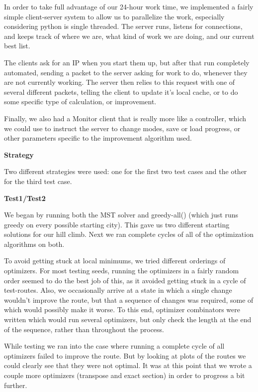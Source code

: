 \documentclass[letterpaper,10pt,titlepage,fleqn]{article}
\begin{document}
In order to take full advantage of our 24-hour work time, we implemented a fairly simple client-server system to allow us to parallelize the work, especially considering python is single threaded.  The server runs, listens for connections, and keeps track of where we are, what kind of work we are doing, and our current best list.  

The clients ask for an IP when you start them up, but after that run completely automated, sending a packet to the server asking for work to do, whenever they are not currently working.  The server then relies to this request with one of several different packets, telling the client to update it's local cache, or to do some specific type of calculation, or improvement.

Finally, we also had a Monitor client that is really more like a controller, which we could use to instruct the server to change modes, save or load progress, or other parameters specific to the improvement algorithm used.

\begin{Large}
\textbf{Strategy} \\
\end{Large}

Two different strategies were used: one for the first two test cases and the other for the third test case.

\textbf{Test1/Test2}

We began by running both the MST solver and greedy-all() (which just runs greedy on every possible starting city). This gave us two different starting solutions for our hill climb. Next we ran complete cycles of all of the optimization algorithms on both.

To avoid getting stuck at local minimums, we tried different orderings of optimizers. For most testing seeds, running the optimizers in a fairly random order seemed to do the best job of this, as it avoided getting stuck in a cycle of test-routes. Also, we occasionally arrive at a state in which a single change wouldn’t improve the route, but that a sequence of changes was required, some of which would possibly make it worse. To this end, optimizer combinators were written which would run several optimizers, but only check the length at the end of the sequence, rather than throughout the process.

While testing we ran into the case where running a complete cycle of all optimizers failed to improve the route. But by looking at plots of the routes we could clearly see that they were not optimal. It was at this point that we wrote a couple more optimizers (transpose and exact section) in order to progress a bit further.
\end{document}
